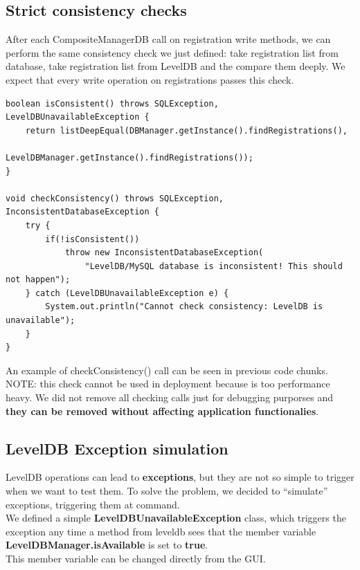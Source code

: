 \documentclass{report}
\begin{document}
\subsection*{Strict consistency checks}
After each CompositeManagerDB call on registration write methods, we can perform the same consistency check we just defined: take registration list from database, take registration list from LevelDB and the compare them deeply. We expect that every write operation on registrations passes this check.
\begin{lstlisting}
boolean isConsistent() throws SQLException, LevelDBUnavailableException {
	return listDeepEqual(DBManager.getInstance().findRegistrations(),
							LevelDBManager.getInstance().findRegistrations());
}

void checkConsistency() throws SQLException, InconsistentDatabaseException {
	try {
		if(!isConsistent())
			throw new InconsistentDatabaseException(
				"LevelDB/MySQL database is inconsistent! This should not happen");
	} catch (LevelDBUnavailableException e) {
		System.out.println("Cannot check consistency: LevelDB is unavailable");
	}
}
\end{lstlisting}
An example of checkConsistency() call can be seen in previous code chunks.\\
NOTE: this check cannot be used in deployment because is too performance heavy. We did not remove all checking calls just for debugging purporses and \textbf{they can be removed without affecting application functionalies}.

\subsection*{LevelDB Exception simulation}
LevelDB operations can lead to \textbf{exceptions}, but they are not so simple to trigger when we want to test them. To solve the problem, we decided to ``simulate'' exceptions, triggering them at command.\\
We defined a simple \textbf{LevelDBUnavailableException} class, which triggers the exception any time a method from leveldb sees that the member variable \textbf{LevelDBManager.isAvailable }is set to \textbf{true}.\\
This member variable can be changed directly from the GUI.


\end{document}
